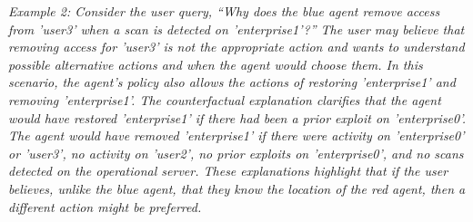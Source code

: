 \textit{Example 2: Consider the user query, “Why does the blue agent remove access from 'user3' when a scan is detected on 'enterprise1'?” 
The user may believe that removing access for 'user3' is not the appropriate action and wants to understand possible alternative actions and when the agent would choose them. 
In this scenario, the agent’s policy also allows the actions of restoring 'enterprise1' and removing 'enterprise1'.
The counterfactual explanation clarifies that the agent would have restored 'enterprise1' if there had been a prior exploit on 'enterprise0'.
The agent would have removed 'enterprise1' if there were activity on 'enterprise0' or 'user3', no activity on 'user2', no prior exploits on 'enterprise0', and no scans detected on the operational server.
These explanations highlight that if the user believes, unlike the blue agent, that they know the location of the red agent, then a different action might be preferred.}